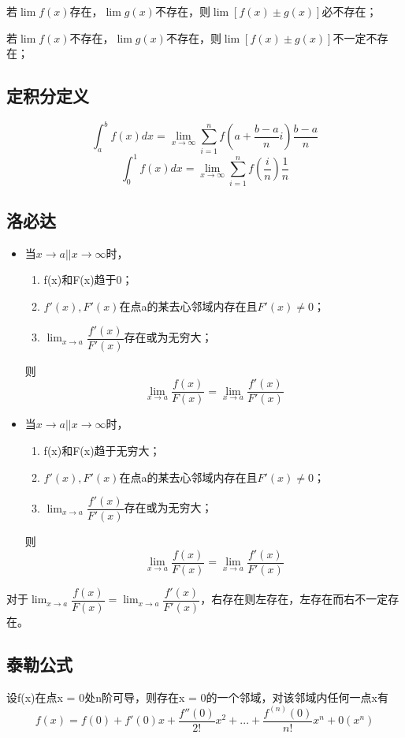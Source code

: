若\(\lim f(x)\)存在，\(\lim g(x)\)不存在，则\(\lim[f(x) \pm g(x)]\)必不存在；

若\(\lim f(x)\)不存在，\(\lim g(x)\)不存在，则\(\lim[f(x) \pm g(x)]\)不一定不存在；


\subsection{定积分定义}
\[\int_a^bf(x)dx = \lim_{x \to \infty}\sum_{i = 1}^nf(a + \dfrac{b - a}{n}i)\dfrac{b - a}{n}\]
\[\int_0^1f(x)dx = \lim_{x \to \infty}\sum_{i = 1}^nf(\dfrac{i}{n})\dfrac{1}{n}\]


\subsection{洛必达}
\begin{itemize}
    \item 当\(x \to a || x \to \infty\)时，\begin{enumerate}
        \item f(x)和F(x)趋于0；
        \item \(f'(x),F'(x)\)在点a的某去心邻域内存在且\(F'(x) \neq 0\)；
        \item \(\displaystyle \lim_{x \to a}\dfrac{f'(x)}{F'(x)}\)存在或为无穷大；
    \end{enumerate}
    则\[\displaystyle \lim_{x \to a}\dfrac{f(x)}{F(x)} = \lim_{x \to a}\dfrac{f'(x)}{F'(x)}\]
    \item 当\(x \to a || x \to \infty\)时，\begin{enumerate}
        \item f(x)和F(x)趋于无穷大；
        \item \(f'(x),F'(x)\)在点a的某去心邻域内存在且\(F'(x) \neq 0\)；
        \item \(\displaystyle \lim_{x \to a}\dfrac{f'(x)}{F'(x)}\)存在或为无穷大；
    \end{enumerate}
    则\[\displaystyle \lim_{x \to a}\dfrac{f(x)}{F(x)} = \lim_{x \to a}\dfrac{f'(x)}{F'(x)}\]
\end{itemize}




对于\(\displaystyle \lim_{x \to a}\dfrac{f(x)}{F(x)} = \lim_{x \to a}\dfrac{f'(x)}{F'(x)}\)，右存在则左存在，左存在而右不一定存在。


\subsection{泰勒公式}
设f(x)在点x = 0处n阶可导，则存在x = 0的一个邻域，对该邻域内任何一点x有\[f(x) = f(0) + f'(0)x + \dfrac{f''(0)}{2!}x^2 + ... + \dfrac{f^{(n)}(0)}{n!}x^n + 0(x^n)\]

